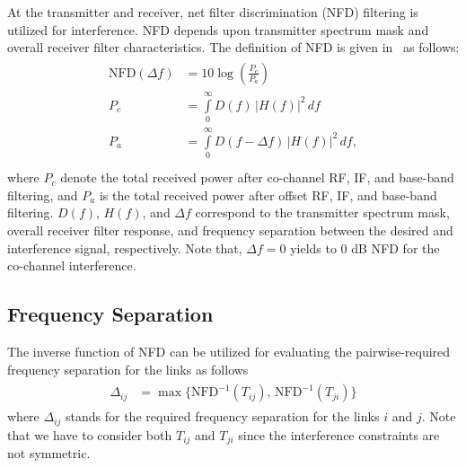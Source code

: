 \documentclass[10pt,twocolumn,twoside]{JCNtran}
\newcommand{\tackintij}[2]{T_{#1#2}}
\newcommand{\freqsep}[2]{\Delta_{#1#2}}
\begin{document}
At the transmitter and receiver, net filter discrimination (NFD) filtering is utilized for interference. NFD depends upon transmitter spectrum mask and overall receiver filter characteristics. The definition of NFD is given in~\cite{etsi2005tr101} as follows:
\begin{align}
\begin{split}
\text{NFD} (\Delta f)&= 10 \log\left(\frac{P_c}{P_a}\right)\\
P_c &= \int\limits_{0}^{\infty} D(f) \, |H(f)|^2 \,df \\
P_a &= \int\limits_{0}^{\infty} D(f-\Delta f) \, |H(f)|^2 \,df, \\
\end{split}
\end{align}
where $P_c$ denote the total received power after co-channel RF, IF, and base-band filtering, and $P_a$ is the total received power after offset RF, IF, and base-band filtering. $D(f)$, $H(f)$, and $\Delta f$ correspond to the transmitter spectrum mask, overall receiver filter response, and frequency separation between the desired and interference signal, respectively. Note that, $\Delta f = 0$ yields to $0$ dB NFD for the co-channel interference. 


\subsection{Frequency Separation}
\label{subsec_freq_sep}
The inverse function of NFD can be utilized for evaluating the pairwise-required frequency separation for the links as follows 
\begin{align}
\begin{split}
\label{eq_freq_sep}
\freqsep{i}{j}  &= \max \{\text{NFD}^{-1}(\tackintij{i}{j}), \, \text{NFD}^{-1}(\tackintij{j}{i})\}
\end{split}
\end{align}
where $\freqsep{i}{j}$ stands for the required frequency separation for the links $i$ and $j$. Note that we have to consider both $\tackintij{i}{j}$ and $\tackintij{j}{i}$ since the interference constraints are not symmetric.
\end{document}
